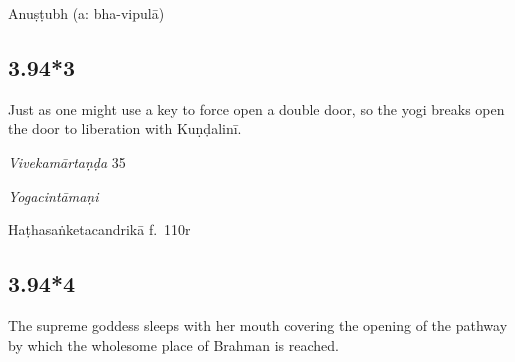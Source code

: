 \begin{ekdosis}
\begin{philcomm}[hp03_094_2]
\end{philcomm}

\begin{metre}[hp03_094_2]
Anuṣṭubh (a: bha-vipulā)
\end{metre}

\subsection*{3.94*3}
\begin{translation}[hp03_094_3]
Just as one might use a key to force open a double door, so the yogi breaks open the door to liberation with Kuṇḍalinī.
\end{translation}

\begin{sources}[hp03_094_3]
\emph{Vivekamārtaṇḍa} 35
\begin{versinnote}
\end{versinnote}
\end{sources}

\begin{testimonia}[hp03_094_3]
\emph{Yogacintāmaṇi}
\begin{versinnote}
\end{versinnote}

Haṭhasaṅketacandrikā f.~110r
\begin{versinnote}
\end{versinnote}
\end{testimonia}



\subsection*{3.94*4}
\begin{translation}[hp03_094_4]
The supreme goddess sleeps with her mouth covering the opening of the pathway by which the wholesome place of Brahman is reached.
\end{translation}
%


\end{ekdosis}
